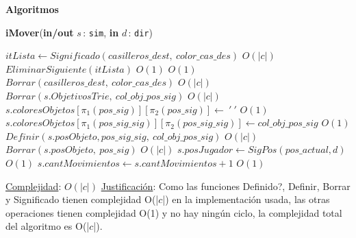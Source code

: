 \documentclass[a4paper,10pt]{article}
\let\TipoVariable=\texttt
\let\ModificadorArgumento=\textbf
\newcommand{\In}[2]{\ModificadorArgumento{in} \ensuremath{#1}\,: \TipoVariable{#2}\xspace}
\newcommand{\Inout}[2]{\ModificadorArgumento{in/out} \ensuremath{#1}\,: \TipoVariable{#2}\xspace}
\newenvironment{Algoritmos}{%
  \vspace*{2ex}%
  \noindent\textbf{\Large Algoritmos}%
  \vspace*{2ex}%
}{}
\begin{document}
\begin{Algoritmos}
\begin{algorithm}[H]{\textbf{iMover}}{(\Inout{s}{sim}, \In{d}{dir})}
\begin{algorithmic}[1]
                    \State $itLista \gets Significado(casilleros\_dest, \ color\_cas\_des)$                                                     \Comment $O(|c|)$
                    \State $EliminarSiguiente(itLista)$                                                                                         \Comment $O(1)$
                                                                                                       \Comment $O(1)$
                        \State $Borrar(casilleros\_dest, \ color\_cas\_des)$                                                                    \Comment $O(|c|)$
                    \Else
                        \State $Borrar(s.ObjetivosTrie, \ col\_obj\_pos\_sig)$                                                                  \Comment $O(|c|)$
                    \EndIf
                \EndIf       
                \State $s.coloresObjetos[\pi_{1}(pos\_sig)][\pi_{2}(pos\_sig)] \gets \ ' \ '$                                                   \Comment $O(1)$
                \State $s.coloresObjetos[\pi_{1}(pos\_sig\_sig)][\pi_{2}(pos\_sig\_sig)] \gets col\_obj\_pos\_sig$                              \Comment $O(1)$
                \State $Definir(s.posObjeto, pos\_sig\_sig,\ col\_obj\_pos\_sig)$                                                               \Comment $O(|c|)$
                \State $Borrar(s.posObjeto,\ pos\_sig)$                                                                                         \Comment $O(|c|)$
            \EndIf
            \State $s.posJugador \gets SigPos(pos\_actual, d)$                                                                                  \Comment $O(1)$
        \EndIf
        \State $s.cantMovimientos \gets s.cantMovimientos + 1$                                                                                  \Comment $O(1)$

      \medskip
    
      \Statex \underline{Complejidad}: $O(|c|)$
      \Statex \underline{Justificación}: Como las funciones Definido?, Definir, Borrar y Significado tienen complejidad O(|$c$|) en la implementación usada, las otras operaciones tienen complejidad O(1) y no hay ningún ciclo, la complejidad total del algoritmo es O(|$c$|).
      \end{algorithmic}
\end{algorithm} 


\end{Algoritmos}
\end{document}
